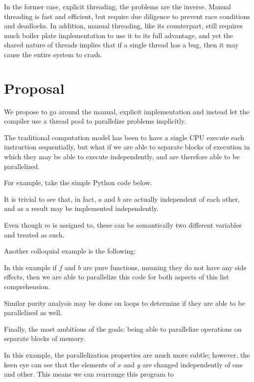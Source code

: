 \documentclass{article}
\begin{document}
\begin{multicols}{2}
In the former case, explicit threading, the problems are the inverse.
Manual threading is fast and efficient, but require due diligence to 
prevent race conditions and deadlocks. In addition, manual threading,
like its counterpart, still requires much boiler plate implementation
to use it to its full advantage, and yet the shared nature of threads
implies that if a single thread has a bug, then it may cause the entire
system to crash.

\section{Proposal}

We propose to go around the manual, explicit implementation and instead
let the compiler use a thread pool to parallelize problems implicitly.

The traditional computation model has been to have a single CPU execute
each instruction sequentially, but what if we are able to separate blocks
of execution in which they may be able to execute independently, and are
therefore able to be parallelized.

For example, take the simple Python code below.


It is trivial to see that, in fact, $a$ and $b$ are actually independent of
each other, and as a result may be implemented independently.

Even though $m$ is assigned to, these can be semantically two different variables
and treated as such.

Another colloquial example is the following: 


In this example if $f$ and $b$ are pure functions, meaning they do not have any
side effects, then we are able to parallelize this code for both aspects of this
list comprehension.

Similar purity analysis may be done on loops to determine if they are able to
be parallelized as well.

Finally, the most ambitious of the goals: being able to parallelize operations on
separate blocks of memory.


In this example, the parallelization properties are much more subtle; however, the
keen eye can see that the elements of $x$ and $y$ are changed independently of one
and other. This means we can rearrange this program to 


\end{multicols}
\end{document}
